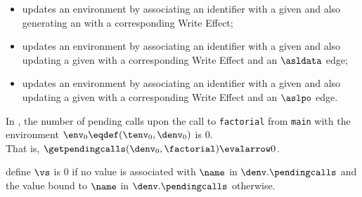 \begin{itemize}
  \item {} updates an environment by associating an identifier with a given \nativevalueterm{}
        and also generating an \executiongraphterm{} with a corresponding Write Effect;
  \item {} updates an environment by associating an identifier with a given \nativevalueterm{}
        and also updating a given \executiongraphterm{} with a corresponding Write Effect and an $\asldata$ edge;
  \item {} updates an environment by associating an identifier with a given \nativevalueterm{}
        and also updating a given \executiongraphterm{} with a corresponding Write Effect and an $\aslpo$ edge.
\end{itemize}


In , the number of pending calls upon the call to \verb|factorial| from \verb|main|
with the environment $\env_0 \eqdef (\tenv_0, \denv_0)$ is $0$.\\
That is, $\getpendingcalls(\denv_0, \factorial) \evalarrow 0$.

\ProseParagraph
define $\vs$ is $0$ if no value is associated with $\name$ in $\denv.\pendingcalls$ and the value bound to
$\name$ in $\denv.\pendingcalls$ otherwise.

\FormallyParagraph
\begin{mathpar}
\end{mathpar}


